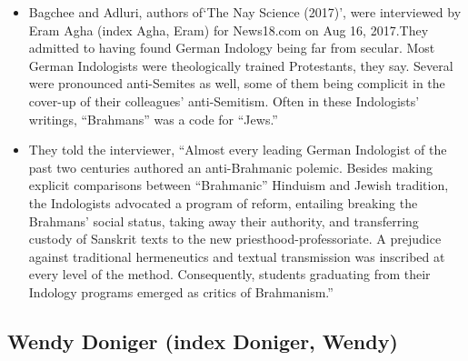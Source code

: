 \begin{itemize}
\item Bagchee and Adluri, authors of‘The Nay Science (2017)’, were interviewed by Eram Agha (index Agha, Eram) for News18.com on Aug 16, 2017.They admitted to having found German Indology being far from secular. Most German Indologists were theologically trained Protestants, they say. Several were pronounced anti-Semites as well, some of them being complicit in the cover-up of their colleagues’ anti-Semitism. Often in these Indologists’ writings, “Brahmans” was a code for “Jews.”

 \item They told the interviewer, “Almost every leading German Indologist of the past two centuries authored an anti-Brahmanic polemic. Besides making explicit comparisons between “Brahmanic” Hinduism and Jewish tradition, the Indologists advocated a program of reform, entailing breaking the Brahmans’ social status, taking away their authority, and transferring custody of Sanskrit texts to the new priesthood-professoriate. A prejudice against traditional hermeneutics and textual transmission was inscribed at every level of the method. Consequently, students graduating from their Indology programs emerged as critics of Brahmanism.”

\end{itemize}


\subsection*{Wendy Doniger (index Doniger, Wendy)}

